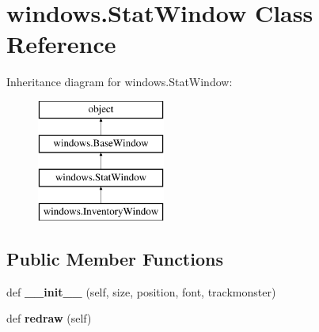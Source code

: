 \hypertarget{classwindows_1_1_stat_window}{}\section{windows.\+Stat\+Window Class Reference}
\label{classwindows_1_1_stat_window}
Inheritance diagram for windows.\+Stat\+Window\+:\begin{figure}[H]
\begin{center}
\leavevmode
\includegraphics[height=4.000000cm]{classwindows_1_1_stat_window}
\end{center}
\end{figure}
\subsection*{Public Member Functions}
\begin{DoxyCompactItemize}
\item 
\hypertarget{classwindows_1_1_stat_window_a71c1f7506b414410205afb99ff48887c}{}def {\bfseries \+\_\+\+\_\+init\+\_\+\+\_\+} (self, size, position, font, trackmonster)\label{classwindows_1_1_stat_window_a71c1f7506b414410205afb99ff48887c}

\item 
\hypertarget{classwindows_1_1_stat_window_a90c24e5f3a76fa826c644226c7fb7935}{}def {\bfseries redraw} (self)\label{classwindows_1_1_stat_window_a90c24e5f3a76fa826c644226c7fb7935}

\end{DoxyCompactItemize}
